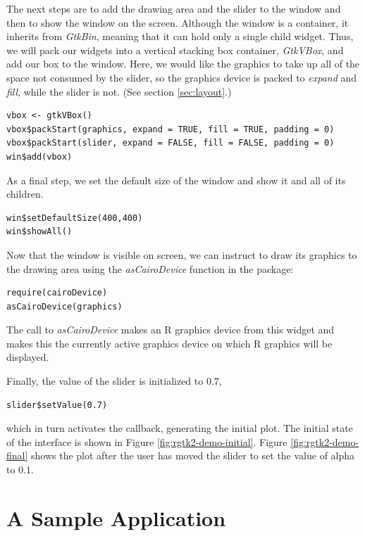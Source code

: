 \documentclass[article]{jss}
\begin{document}
The next steps are to add the drawing area and the slider to the
window and then to show the window on the screen. Although the window
is a container, it inherits from \emph{GtkBin}, meaning that it can
hold only a single child widget. Thus, we will pack our widgets into a
vertical stacking box container, \emph{GtkVBox}, and add our box to
the window.  Here, we would like the graphics to take up all of the
space not consumed by the slider, so the graphics device is packed to
\emph{expand} and \emph{fill}, while the slider is not.
(See section \ref{sec:layout}.)
\begin{verbatim}
vbox <- gtkVBox()
vbox$packStart(graphics, expand = TRUE, fill = TRUE, padding = 0)
vbox$packStart(slider, expand = FALSE, fill = FALSE, padding = 0)
win$add(vbox)
\end{verbatim}

As a final step, we set the default size of the window and show it and
all of its children.
\begin{verbatim}
win$setDefaultSize(400,400)
win$showAll() 
\end{verbatim}

Now that the window is visible on screen, we can instruct 
to draw its graphics to the drawing area using the
\emph{asCairoDevice} function in the  package:
\begin{verbatim}
require(cairoDevice)
asCairoDevice(graphics)
\end{verbatim}
The call to \emph{asCairoDevice} makes an R graphics device from this
widget and makes this the currently active graphics device on which R
graphics will be displayed.

Finally, the value of the slider is initialized to $0.7$,
\begin{verbatim}
slider$setValue(0.7)
\end{verbatim}
which in turn activates the callback, generating the initial plot. The
initial state of the interface is shown in Figure
\ref{fig:rgtk2-demo-initial}.  Figure \ref{fig:rgtk2-demo-final} shows
the plot after the user has moved the slider to set the value of alpha
to $0.1$.


\section{A Sample Application}\label{sec:spreadsheet-example}
\end{document}
